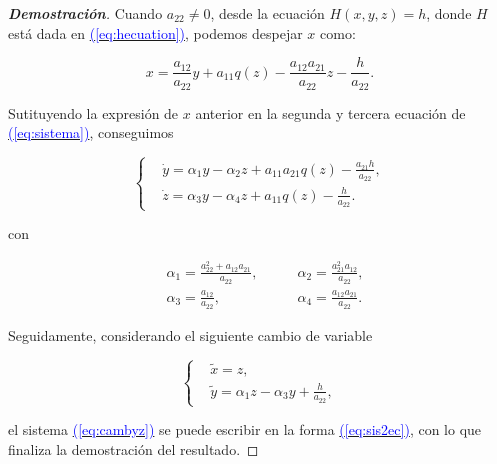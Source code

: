 \documentclass[12pt,a4paper]{report} %
\newcommand{\eref}[1]{\hyperref[#1]{\textcolor{blue}{(\ref*{#1})}}}
\begin{document}
	\begin{proof}[\textbf{Demostración}]
		 Cuando $a_{22}\neq0$, desde la ecuación $H(x,y,z)=h$, donde $H$ está dada en \eref{eq:hecuation}, podemos despejar $x$ como:
		
		\begin{equation}
			\label{eq:xeqn}
			x=\frac{a_{12}}{a_{22}}y+a_{11}q(z)-\frac{a_{12}a_{21}}{a_{22}}z-\frac{h}{a_{22}}.
		\end{equation}\smallskip
		
		\noindent Sutituyendo la expresión de $x$ anterior en la segunda y tercera ecuación de \eref{eq:sistema}, conseguimos
		
		\begin{equation}
			\label{eq:cambyz}
			\left\{
			\begin{aligned}
				&\dot{y}=\alpha_1y-\alpha_2z+a_{11}a_{21}q(z)-\frac{a_{21}h}{a_{22}}, \\[2mm]
				&\dot{z}=\alpha_3y-\alpha_4z+a_{11}q(z)-\frac{h}{a_{22}}.
			\end{aligned}
			\right.
		\end{equation}
		
	    \noindent con
		
		\begin{equation}
			\label{eq:alphamatriz}
			\begin{aligned}
				&\alpha_1=\frac{a_{22}^2+a_{12}a_{21}}{a_{22}}, \qquad &\alpha_2=\frac{a_{21}^2a_{12}}{a_{22}},\\[2mm]
				&\alpha_3=\frac{a_{12}}{a_{22}}, \qquad &\alpha_4=\frac{a_{12}a_{21}}{a_{22}}.
			\end{aligned}
		\end{equation}\smallskip
		
		\noindent Seguidamente, considerando el siguiente cambio de variable
		
		\begin{equation}
			\label{eq:xytilde}
			\left\{
			\begin{aligned}
				&\tilde{x}=z, \\[2mm]
				&\tilde{y}=\alpha_1z-\alpha_3y+\frac{h}{a_{22}},
			\end{aligned}
			\right.
		\end{equation}\smallskip
		
		 \noindent el sistema \eref{eq:cambyz} se puede escribir en la forma \eref{eq:sis2ec}, con lo que finaliza la demostración del resultado.
		
	\end{proof}
	
\end{document}
